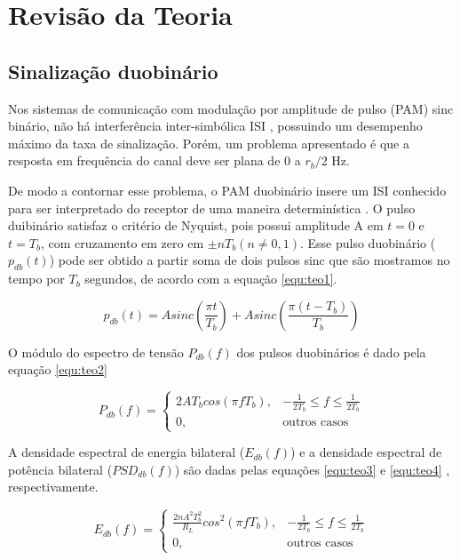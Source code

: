 \newpage
\section{Revisão da Teoria}

\subsection{Sinalização duobinário}
Nos sistemas de comunicação com modulação por amplitude de pulso (PAM) sinc 
binário, não há interferência inter-simbólica ISI \cite{Lathi}, possuindo 
um desempenho máximo da taxa de sinalização. Porém, um problema apresentado é 
que a resposta em frequência do canal deve ser plana de 0 a $r_b/2$ Hz.

De modo a contornar esse problema, o PAM duobinário insere um ISI conhecido 
para ser interpretado do receptor de uma maneira determinística \cite{Couch}. O 
pulso duibinário satisfaz o critério de Nyquist, pois possui amplitude A em 
$t=0$ e $t=T_b$, com cruzamento em zero em $\pm nT_b (n\neq 0,1)$. Esse pulso 
duobinário ($p_{db}(t)$) pode ser obtido a partir soma de dois pulsos sinc que 
são mostramos no tempo por $T_b$ segundos, de acordo com a equação 
\ref{equ:teo1}.

\begin{equation}
  \label{equ:teo1}
  p_{db}(t) = Asinc \left( \frac{\pi t }{T_b} \right) + Asinc \left( \frac{\pi 
  (t - T_b) }{T_b} \right)
\end{equation} 

O módulo do espectro de tensão $P_{db}(f)$ dos pulsos duobinários é dado pela 
equação \ref{equ:teo2}

\begin{equation}
  \label{equ:teo2}
  P_{db}(f) = 
  \begin{cases}
    2AT_b cos(\pi f T_b), & -\frac{1}{2T_b} \leq f \leq \frac{1}{2T_b} \\
    0, & \mbox{outros casos} 
  \end{cases}
\end{equation}

A densidade espectral de energia bilateral ($E_{db}(f)$) e a densidade 
espectral de potência bilateral ($PSD_{db} (f)$) são dadas pelas equações 
\ref{equ:teo3} e \ref{equ:teo4} \cite{Proakis}, respectivamente.

\begin{equation}
  \label{equ:teo3}
  E_{db}(f) = 
  \begin{cases}
    \frac{2nA^2T_b^2}{R_L}cos^2	(\pi f T_b), & -\frac{1}{2T_b} \leq f \leq 
    \frac{1}{2T_b} \\
    0, & \mbox{outros casos} 
  \end{cases}
\end{equation}

